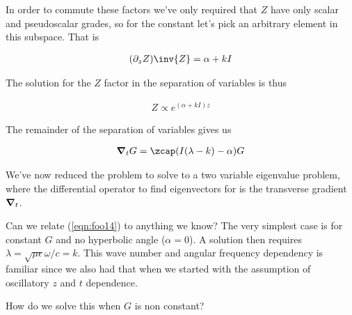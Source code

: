 In order to commute these factors we've only required that $Z$ have only scalar and pseudoscalar grades, so for the constant let's pick an arbitrary element in this subspace.  That is

\begin{align}\label{eqn:foo12}
(\partial_z Z)\inv{Z} = \alpha + k I
\end{align}

The solution for the $Z$ factor in the separation of variables is thus

\begin{align}\label{eqn:foo13}
Z \propto e^{(\alpha + k I)z}
\end{align}

The remainder of the separation of variables gives us

\begin{align}\label{eqn:foo14}
\spacegrad_t G = \zcap (I (\lambda -k) -\alpha) G
\end{align}

We've now reduced the problem to solve to a two variable eigenvalue problem, where the differential operator to find eigenvectors for is the transverse gradient $\boldsymbol{\nabla}_t$.

Can we relate (\ref{eqn:foo14}) to anything we know?  The very simplest case is for constant $G$ and no hyperbolic angle ($\alpha=0$).  A solution then requires $\lambda = \sqrt{\mu\epsilon} \omega/c = k$.  This wave number and angular frequency dependency is familiar since we also had that when we started with the assumption of oscillatory $z$ and $t$ dependence.

How do we solve this when $G$ is non constant?

\EndArticle
